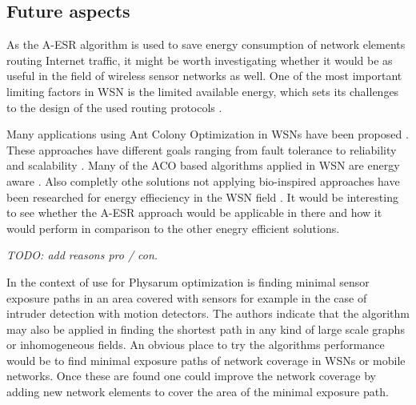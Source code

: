 \documentclass[cameraready]{IWORK2014}
\begin{document}
\subsection{Future aspects}
As the A-ESR algorithm is used to save energy consumption of network elements routing Internet traffic, it might be worth investigating whether it would be as useful in the field of wireless sensor networks as well. One of the most important limiting factors in WSN is the limited available energy, which sets its challenges to the design of the used routing protocols \cite{hylsberg2011bioinspired}.

Many applications using Ant Colony Optimization in WSNs have been proposed \cite{bennis2013enhanced, zhang2004improvements, camilo2006energy, cai2006aco, sun2008asar, kiri2007self, ghasemaghaei2007ant}. These approaches have different goals ranging from fault tolerance \cite{zhang2004improvements} to reliability and scalability \cite{kiri2007self}. Many of the ACO based algorithms applied in WSN are energy aware \cite{saleem2011swarm}. Also completly othe solutions not applying bio-inspired approaches have been researched for energy effieciency in the WSN field \cite{wightman2008a3}. It would be interesting to see whether the A-ESR approach would be applicable in there and how it would perform in comparison to the other enegry efficient solutions.

\textit{TODO: add reasons pro / con.}

In \cite{liu2012physarum} the context of use for Physarum optimization is finding minimal sensor exposure paths in an area covered with sensors for example in the case of intruder detection with motion detectors. The authors indicate that the algorithm may also be applied in finding the shortest path in any kind of large scale graphs or inhomogeneous fields. An obvious place to try the algorithms performance would be to find minimal exposure paths of network coverage in WSNs or mobile networks. Once these are found one could improve the network coverage by adding new network elements to cover the area of the minimal exposure path.



\end{document}
